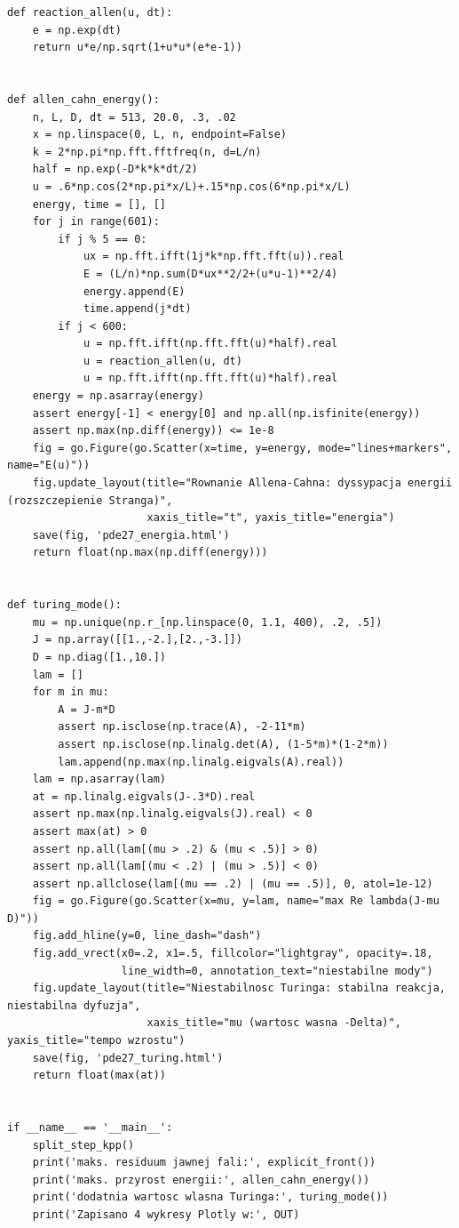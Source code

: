 \begin{lstlisting}[style=pythonpde,caption={Fale reakcji--dyfuzji, energia i niestabilność Turinga (Plotly)},label={code:pde27-plotly}]
def reaction_allen(u, dt):
    e = np.exp(dt)
    return u*e/np.sqrt(1+u*u*(e*e-1))


def allen_cahn_energy():
    n, L, D, dt = 513, 20.0, .3, .02
    x = np.linspace(0, L, n, endpoint=False)
    k = 2*np.pi*np.fft.fftfreq(n, d=L/n)
    half = np.exp(-D*k*k*dt/2)
    u = .6*np.cos(2*np.pi*x/L)+.15*np.cos(6*np.pi*x/L)
    energy, time = [], []
    for j in range(601):
        if j % 5 == 0:
            ux = np.fft.ifft(1j*k*np.fft.fft(u)).real
            E = (L/n)*np.sum(D*ux**2/2+(u*u-1)**2/4)
            energy.append(E)
            time.append(j*dt)
        if j < 600:
            u = np.fft.ifft(np.fft.fft(u)*half).real
            u = reaction_allen(u, dt)
            u = np.fft.ifft(np.fft.fft(u)*half).real
    energy = np.asarray(energy)
    assert energy[-1] < energy[0] and np.all(np.isfinite(energy))
    assert np.max(np.diff(energy)) <= 1e-8
    fig = go.Figure(go.Scatter(x=time, y=energy, mode="lines+markers", name="E(u)"))
    fig.update_layout(title="Rownanie Allena-Cahna: dyssypacja energii (rozszczepienie Stranga)",
                      xaxis_title="t", yaxis_title="energia")
    save(fig, 'pde27_energia.html')
    return float(np.max(np.diff(energy)))


def turing_mode():
    mu = np.unique(np.r_[np.linspace(0, 1.1, 400), .2, .5])
    J = np.array([[1.,-2.],[2.,-3.]])
    D = np.diag([1.,10.])
    lam = []
    for m in mu:
        A = J-m*D
        assert np.isclose(np.trace(A), -2-11*m)
        assert np.isclose(np.linalg.det(A), (1-5*m)*(1-2*m))
        lam.append(np.max(np.linalg.eigvals(A).real))
    lam = np.asarray(lam)
    at = np.linalg.eigvals(J-.3*D).real
    assert np.max(np.linalg.eigvals(J).real) < 0
    assert max(at) > 0
    assert np.all(lam[(mu > .2) & (mu < .5)] > 0)
    assert np.all(lam[(mu < .2) | (mu > .5)] < 0)
    assert np.allclose(lam[(mu == .2) | (mu == .5)], 0, atol=1e-12)
    fig = go.Figure(go.Scatter(x=mu, y=lam, name="max Re lambda(J-mu D)"))
    fig.add_hline(y=0, line_dash="dash")
    fig.add_vrect(x0=.2, x1=.5, fillcolor="lightgray", opacity=.18,
                  line_width=0, annotation_text="niestabilne mody")
    fig.update_layout(title="Niestabilnosc Turinga: stabilna reakcja, niestabilna dyfuzja",
                      xaxis_title="mu (wartosc wasna -Delta)", yaxis_title="tempo wzrostu")
    save(fig, 'pde27_turing.html')
    return float(max(at))


if __name__ == '__main__':
    split_step_kpp()
    print('maks. residuum jawnej fali:', explicit_front())
    print('maks. przyrost energii:', allen_cahn_energy())
    print('dodatnia wartosc wlasna Turinga:', turing_mode())
    print('Zapisano 4 wykresy Plotly w:', OUT)

\end{lstlisting}


